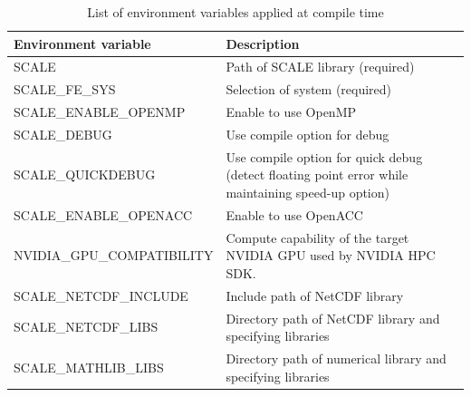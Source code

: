 \begin{table}[htb]
\begin{center}
\caption{List of environment variables applied at compile time}
\begin{tabularx}{150mm}{|l|X|} \hline
 \rowcolor[gray]{0.9} Environment variable & Description \\ \hline
 SCALE                    & Path of SCALE library (required) \\ \hline
 SCALE\_FE\_SYS           & Selection of system (required) \\ \hline
 SCALE\_ENABLE\_OPENMP    & Enable to use OpenMP \\ \hline
 SCALE\_DEBUG             & Use compile option for debug \\ \hline
 SCALE\_QUICKDEBUG        & Use compile option for quick debug (detect floating point error while maintaining speed-up option) \\ \hline
 SCALE\_ENABLE\_OPENACC   & Enable to use OpenACC \\ 
 NVIDIA\_GPU\_COMPATIBILITY & Compute capability of the target NVIDIA GPU used by NVIDIA HPC SDK. \\ \hline
 SCALE\_NETCDF\_INCLUDE   & Include path of NetCDF library \\ \hline
 SCALE\_NETCDF\_LIBS      & Directory path of NetCDF library and specifying libraries \\ \hline
 SCALE\_MATHLIB\_LIBS     & Directory path of numerical library and specifying libraries \\ \hline
\end{tabularx}
\label{tab:env_var_list}
\end{center}
\end{table}


